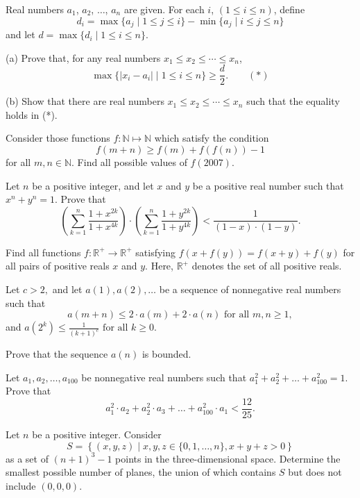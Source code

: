 \item[\textbf{A1.}]
Real numbers 
$ a_{1}$, 
$ a_{2}$, 
$ \ldots$,
$ a_{n}$
 are given. For each 
$ i$, 
$ (1 \leq i \leq n )$, 
 define
\[ d_{i} = \max \{ a_{j}\mid 1 \leq j \leq i \} - \min \{ a_{j}\mid i \leq j \leq n \}
\]
and let 
$ d = \max \{d_{i}\mid 1 \leq i \leq n \}$.

(a) Prove that, for any real numbers 
$ x_{1}\leq x_{2}\leq \cdots \leq x_{n}$, 
\[ \max \{ |x_{i} - a_{i}| \mid 1 \leq i \leq n \}\geq \frac {d}{2}. \quad \quad (*)
\]

(b) Show that there are real numbers 
$ x_{1}\leq x_{2}\leq \cdots \leq x_{n}$
 such that the equality holds in (*).

\item[\textbf{A2.}]
Consider those functions 
$ f: \mathbb{N} \mapsto \mathbb{N}$
 which satisfy the condition
\[ f(m + n) \geq f(m) + f(f(n)) - 1
\]
for all 
$ m,n \in \mathbb{N}.$
 Find all possible values of 
$ f(2007).$

\item[\textbf{A3.}]
Let 
$ n$
 be a positive integer, and let 
$ x$
 and 
$ y$
 be a positive real number such that 
$ x^n + y^n = 1.$
 Prove that
\[ \left(\sum^n_{k = 1} \frac {1 + x^{2k}}{1 + x^{4k}} \right) \cdot \left( \sum^n_{k = 1} \frac {1 + y^{2k}}{1 + y^{4k}} \right) < \frac {1}{(1 - x) \cdot (1 - y)}.
\]

\item[\textbf{A4.}]
Find all functions 
$ f: \mathbb{R}^{ + }\to\mathbb{R}^{ + }$
 satisfying 
$ f\left(x + f\left(y\right)\right) = f\left(x + y\right) + f\left(y\right)$
 for all pairs of positive reals 
$ x$
 and 
$ y$.
 Here, 
$ \mathbb{R}^{ + }$
 denotes the set of all positive reals.

\item[\textbf{A5.}]
Let 
$ c > 2,$
 and let 
$ a(1), a(2), \ldots$
 be a sequence of nonnegative real numbers such that
\[ a(m + n) \leq 2 \cdot a(m) + 2 \cdot a(n) \text{ for all } m,n \geq 1,
\]
and 
$ a\left(2^k \right) \leq \frac {1}{(k + 1)^c} \text{ for all } k \geq 0.$

 Prove that the sequence 
$ a(n)$
 is bounded.

\item[\textbf{A6.}]
Let 
$ a_1, a_2, \ldots, a_{100}$
 be nonnegative real numbers such that 
$ a^2_1 + a^2_2 + \ldots + a^2_{100} = 1.$
 Prove that
\[ a^2_1 \cdot a_2 + a^2_2 \cdot a_3 + \ldots + a^2_{100} \cdot a_1 < \frac {12}{25}.
\]

\item[\textbf{A7.}]
Let 
$ n$
 be a positive integer. Consider
\[ S = \left\{ (x,y,z) \mid x,y,z \in \{ 0, 1, \ldots, n\}, x + y + z > 0 \right \}
\]
as a set of 
$ (n + 1)^{3} - 1$
 points in the three-dimensional space. Determine the smallest possible number of planes, the union of which contains 
$ S$
 but does not include 
$ (0,0,0)$.